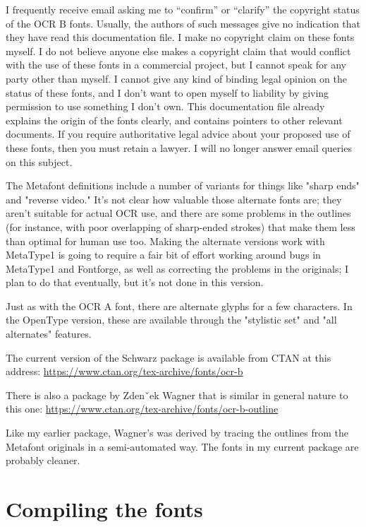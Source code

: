 \documentclass{article}
\begin{document}
I frequently receive email asking me to ``confirm'' or ``clarify'' the
copyright status of the OCR B fonts.  Usually, the authors of such messages
give no indication that they have read this documentation file.  I make no
copyright claim on these fonts myself.  I do not believe anyone else makes a
copyright claim that would conflict with the use of these fonts in a
commercial project, but I cannot speak for any party other than myself.  I
cannot give any kind of binding legal opinion on the status of these fonts,
and I don't want to open myself to liability by giving permission to use
something I don't own.  This documentation file already explains the origin
of the fonts clearly, and contains pointers to other relevant documents.  If
you require authoritative legal advice about your proposed use of these
fonts, then you must retain a lawyer.  I will no longer answer email queries
on this subject.

The Metafont definitions include a number of variants for things like
"sharp ends" and "reverse video." It's not clear how valuable those
alternate fonts are; they aren't suitable for actual OCR use, and there are
some problems in the outlines (for instance, with poor overlapping of
sharp-ended strokes) that make them less than optimal for human use too. 
Making the alternate versions work with MetaType1 is going to require a fair
bit of effort working around bugs in MetaType1 and Fontforge, as well as
correcting the problems in the originals; I plan to do that eventually, but
it's not done in this version.

Just as with the OCR A font, there are alternate glyphs for a
few characters.  In the OpenType version, these are available through the
"stylistic set" and "all alternates" features.

The current version of the Schwarz package is available from CTAN at this
address:  \url{https://www.ctan.org/tex-archive/fonts/ocr-b}

There is also a package by Zdenˇ\hspace{-0.1in}ek Wagner that is similar
in general nature to this one:
\url{https://www.ctan.org/tex-archive/fonts/ocr-b-outline}

Like my earlier package, Wagner's was derived by tracing the outlines from
the Metafont originals in a semi-automated way.  The fonts in my current
package are probably cleaner.

\section{Compiling the fonts}
\end{document}
